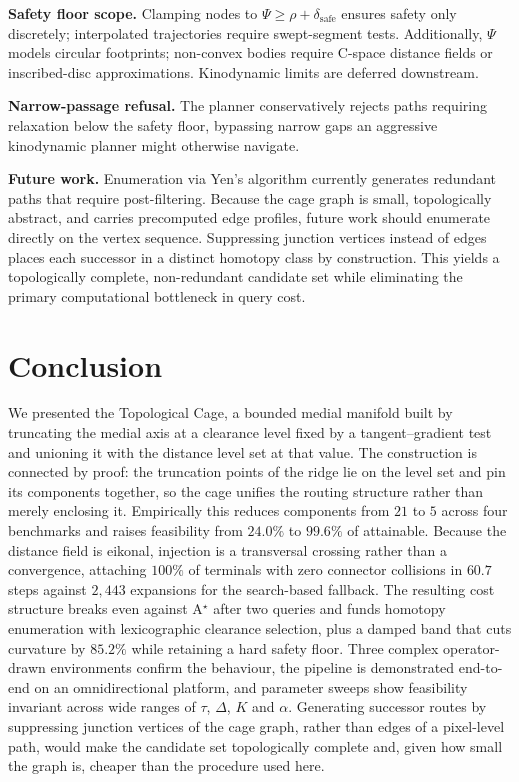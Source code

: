 \documentclass[conference]{IEEEtran}
\begin{document}
\textbf{Safety floor scope.} Clamping nodes to $\Psi\ge\rho+\delta_{\mathrm{safe}}$ ensures safety only discretely; interpolated trajectories require swept-segment tests. Additionally, $\Psi$ models circular footprints; non-convex bodies require C-space distance fields or inscribed-disc approximations. Kinodynamic limits are deferred downstream.

\textbf{Narrow-passage refusal.} The planner conservatively rejects paths requiring relaxation below the safety floor, bypassing narrow gaps an aggressive kinodynamic planner might otherwise navigate.

\textbf{Future work.} Enumeration via Yen's algorithm currently generates redundant paths that require post-filtering. Because the cage graph is small, topologically abstract, and carries precomputed edge profiles, future work should enumerate directly on the vertex sequence. Suppressing junction vertices instead of edges places each successor in a distinct homotopy class by construction. This yields a topologically complete, non-redundant candidate set while eliminating the primary computational bottleneck in query cost.

\section{Conclusion}

We presented the Topological Cage, a bounded medial manifold built by truncating the medial axis at a clearance level fixed by a tangent--gradient test and unioning it with the distance level set at that value. The construction is connected by proof: the truncation points of the ridge lie on the level set and pin its components together, so the cage unifies the routing structure rather than merely enclosing it. Empirically this reduces components from $21$ to $5$ across four benchmarks and raises feasibility from $24.0\%$ to $99.6\%$ of attainable. Because the distance field is eikonal, injection is a transversal crossing rather than a convergence, attaching $100\%$ of terminals with zero connector collisions in $60.7$ steps against $2{,}443$ expansions for the search-based fallback. The resulting cost structure breaks even against A$^\star$ after two queries and funds homotopy enumeration with lexicographic clearance selection, plus a damped band that cuts curvature by $85.2\%$ while retaining a hard safety floor. Three complex operator-drawn environments confirm the behaviour, the pipeline is demonstrated end-to-end on an omnidirectional platform, and parameter sweeps show feasibility invariant across wide ranges of $\tau$, $\Delta$, $K$ and $\alpha$. Generating successor routes by suppressing junction vertices of the cage graph, rather than edges of a pixel-level path, would make the candidate set topologically complete and, given how small the graph is, cheaper than the procedure used here.
\end{document}
